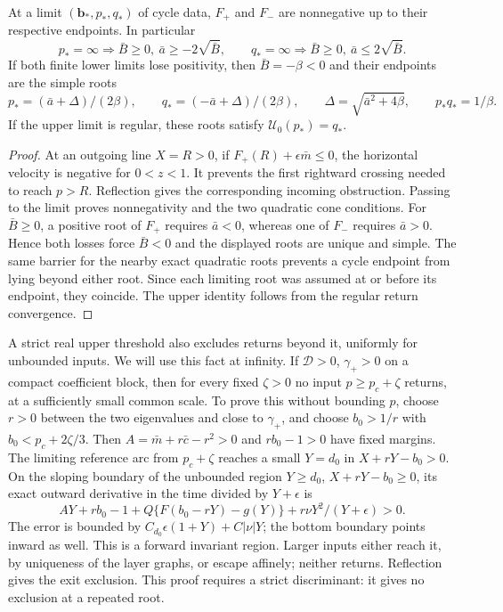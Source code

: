 \begin{lemma}
\label{rw:finite:lower-cones}
At a limit $(\mathbf b_*,p_*,q_*)$ of cycle data, $F_+$ and $F_-$
are nonnegative up to their respective endpoints. In particular
\[
 p_* =\infty\Longrightarrow\bar B\ge0,\ \bar a\ge-2\sqrt{\bar B},
 \qquad
 q_* =\infty\Longrightarrow\bar B\ge0,\ \bar a\le2\sqrt{\bar B}.
\]
If both finite lower limits lose positivity, then $\bar B=-\beta<0$
and their endpoints are the simple roots
\[
 p_*=(\bar a+\Delta)/(2\beta),\qquad
 q_*=(-\bar a+\Delta)/(2\beta),\qquad
 \Delta=\sqrt{\bar a^2+4\beta},\qquad p_*q_*=1/\beta.
\]
If the upper limit is regular, these roots satisfy
$\mathcal U_0(p_*)=q_*$.
\end{lemma}
\begin{proof}
At an outgoing line $X=R>0$, if $F_+(R)+\epsilon\bar m\le0$,
the horizontal velocity is negative for $0<z<1$. It prevents the
first rightward crossing needed to reach $p>R$. Reflection gives
the corresponding incoming obstruction. Passing to the limit proves
nonnegativity and the two quadratic cone conditions.
For $\bar B\ge0$, a positive root of $F_+$ requires $\bar a<0$,
whereas one of $F_-$ requires $\bar a>0$. Hence both losses force
$\bar B<0$ and the displayed roots are unique and simple. The
same barrier for the nearby exact quadratic roots prevents a cycle
endpoint from lying beyond either root. Since each limiting root
was assumed at or before its endpoint, they coincide. The upper
identity follows from the regular return convergence.
\end{proof}

A strict real upper threshold also excludes returns beyond it,
uniformly for unbounded inputs. We will use this fact at infinity.
If $\mathcal D>0$, $\gamma_+>0$ on a compact coefficient block, then for every fixed $\zeta>0$ no input
$p\ge p_c+\zeta$ returns, at a sufficiently small common scale.
To prove this without bounding $p$, choose $r>0$ between the two
eigenvalues and close to $\gamma_+$, and choose $b_0>1/r$ with
$b_0<p_c+2\zeta/3$. Then
$A=\bar m+r\bar c-r^2>0$ and $rb_0-1>0$ have fixed margins.
The limiting reference arc from $p_c+\zeta$ reaches a small
$Y=d_0$ in $X+rY-b_0>0$. On the sloping boundary of the unbounded
region $Y\ge d_0$, $X+rY-b_0\ge0$, its exact outward derivative
in the time divided by $Y+\epsilon$ is
\[
 AY+rb_0-1+Q\{F(b_0-rY)-g(Y)\}
                         +r\nu Y^2/(Y+\epsilon)>0.
\]
The error is bounded by $C_{d_0}\epsilon(1+Y)+C|\nu|Y$;
the bottom boundary points inward as well. This is a forward
invariant region. Larger inputs either reach it, by uniqueness of
the layer graphs, or escape affinely; neither returns. Reflection
gives the exit exclusion. This proof requires a strict discriminant:
it gives no exclusion at a repeated root.
\label{rw:finite:strict-barrier}

